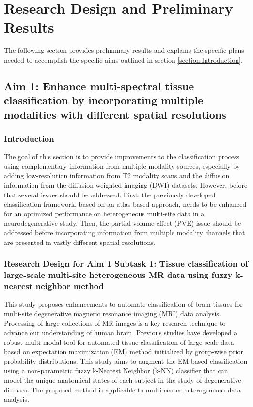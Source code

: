\section{Research Design and Preliminary Results}
The following section provides preliminary results and explains the specific plans needed to accomplish the specific aims outlined in section \ref{section:Introduction}.

\subsection{Aim 1: Enhance multi-spectral tissue classification by incorporating multiple modalities with different spatial resolutions}
\label{section:Aim1ResearchDesign}

\subsubsection{Introduction}
\label{section:Aim1Intro}
The goal of this section is to provide improvements to the classification process using complementary information from multiple modality sources, especially by adding low-resolution information from T2 modality scans and  the diffusion information from the diffusion-weighted imaging (DWI) datasets.
However, before that several issues should be addressed. First, the previously developed classification framework, based on an atlas-based approach, needs to be enhanced for an optimized performance on heterogeneous multi-site data in a neurodegenerative study. Then, the partial volume effect (PVE) issue should be addressed before incorporating information from multiple modality channels that are presented in vastly different spatial resolutions.

\subsubsection{Research Design for Aim 1 Subtask 1: Tissue classification of large-scale multi-site heterogeneous MR data using fuzzy k-nearest neighbor method}
\label{section:Aim1Subtask1ResearchDesign}

This study proposes enhancements to automate classification of brain tissues for multi-site degenerative magnetic resonance imaging (MRI) data analysis.
Processing of large collections of MR images is a key research technique to advance our understanding of human brain. Previous studies have developed a robust multi-modal tool for automated tissue classification of large-scale data based on expectation maximization (EM) method initialized by group-wise prior probability distributions.
This study aims to augment the EM-based classification using a non-parametric fuzzy k-Nearest Neighbor (k-NN) classifier that can model the unique anatomical states of each subject in the study of degenerative diseases. The proposed method is applicable to multi-center heterogeneous data analysis.


